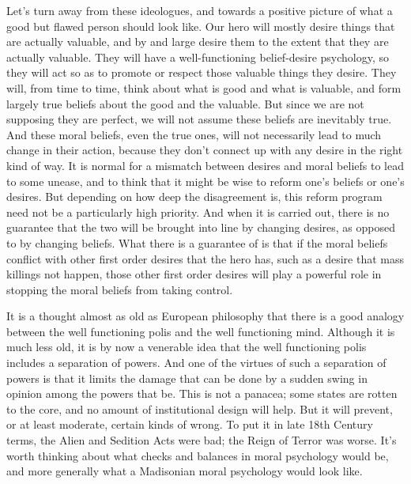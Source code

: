 \documentclass[
  10pt,
  letterpaper,
  twoside]{scrbook}
\begin{document}
Let's turn away from these ideologues, and towards a positive picture of
what a good but flawed person should look like. Our hero will mostly
desire things that are actually valuable, and by and large desire them
to the extent that they are actually valuable. They will have a
well-functioning belief-desire psychology, so they will act so as to
promote or respect those valuable things they desire. They will, from
time to time, think about what is good and what is valuable, and form
largely true beliefs about the good and the valuable. But since we are
not supposing they are perfect, we will not assume these beliefs are
inevitably true. And these moral beliefs, even the true ones, will not
necessarily lead to much change in their action, because they don't
connect up with any desire in the right kind of way. It is normal for a
mismatch between desires and moral beliefs to lead to some unease, and
to think that it might be wise to reform one's beliefs or one's desires.
But depending on how deep the disagreement is, this reform program need
not be a particularly high priority. And when it is carried out, there
is no guarantee that the two will be brought into line by changing
desires, as opposed to by changing beliefs. What there is a guarantee of
is that if the moral beliefs conflict with other first order desires
that the hero has, such as a desire that mass killings not happen, those
other first order desires will play a powerful role in stopping the
moral beliefs from taking control.

It is a thought almost as old as European philosophy that there is a
good analogy between the well functioning polis and the well functioning
mind. Although it is much less old, it is by now a venerable idea that
the well functioning polis includes a separation of powers. And one of
the virtues of such a separation of powers is that it limits the damage
that can be done by a sudden swing in opinion among the powers that be.
This is not a panacea; some states are rotten to the core, and no amount
of institutional design will help. But it will prevent, or at least
moderate, certain kinds of wrong. To put it in late 18th Century terms,
the Alien and Sedition Acts were bad; the Reign of Terror was worse.
It's worth thinking about what checks and balances in moral psychology
would be, and more generally what a Madisonian moral psychology would
look like.
\end{document}
